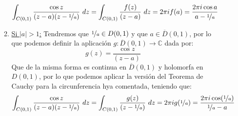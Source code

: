 \begin{ejercicio}
\begin{enumerate}
\begin{description}
\begin{enumerate}
\begin{equation*}
                            \int_{C(0,1)} \dfrac{\cos z}{(z-a)(z-\nicefrac{1}{a})}~dz = \int_{C(0,1)} \dfrac{f(z)}{(z-a)}~dz = 2\pi i f(a) = \dfrac{2\pi i \cos a}{a-\nicefrac{1}{a}}
                        \end{equation*}
                    \item \underline{Si $|a|>1$:} Tendremos que $\nicefrac{1}{a}\in D(0,1)$ y que $a\in \overline{D}(0,1)$, por lo que podemos definir la aplicación $g:\overline{D}(0,1)\to \mathbb{C}$ dada por:
                        \begin{equation*}
                            g(z) = \dfrac{\cos z}{(z-a)}
                        \end{equation*}
                        Que de la misma forma es continua en $\overline{D}(0,1)$ y holomorfa en $D(0,1)$, por lo que podemos aplicar la versión del Teorema de Cauchy para la circunferencia hya comentada, teniendo que:
                        \begin{equation*}
                            \int_{C(0,1)} \dfrac{\cos z}{(z-a)(z-\nicefrac{1}{a})}~dz = \int_{C(0,1)} \dfrac{g(z)}{(z-\nicefrac{1}{a})}~dz = 2\pi i g(\nicefrac{1}{a}) = \dfrac{2\pi i \cos(\nicefrac{1}{a})}{\nicefrac{1}{a}-a}
                        \end{equation*}
                \end{enumerate}
        \end{description}

    \end{enumerate}
\end{ejercicio}

